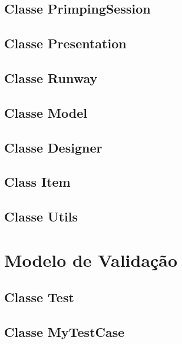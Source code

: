 \documentclass{article}
\begin{document}

\subsection{Classe PrimpingSession}


\subsection{Classe Presentation}


\subsection{Classe Runway}


\subsection{Classe Model}


\subsection{Classe Designer}

\subsection{Class Item}


\subsection{Classe Utils}



\section{Modelo de Validação}
\subsection{Classe Test}


\subsection{Classe MyTestCase}

\end{document}
